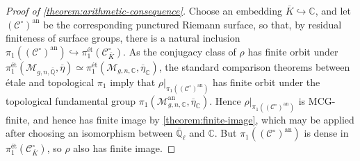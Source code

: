 \begin{proof}[Proof of \autoref{theorem:arithmetic-consequence}]
	Choose an embedding $\overline{K}\hookrightarrow\mathbb{C}$, and let
	$(\mathscr{C}^\circ)^{\text{an}}$ be the corresponding punctured Riemann
	surface, so that,
	by residual finiteness of surface groups,
	there is a natural inclusion
	$\pi_1((\mathscr{C}^\circ)^{\text{an}})\hookrightarrow
	\pi_1^{\text{\'et}}(\mathscr{C}^\circ_{\overline{K}})$. As the conjugacy
	class of $\rho$ has finite orbit under
	$\pi_1^{\text{\'et}}(\mathscr{M}_{g,n, \overline{\mathbb{Q}}},
	\overline{\eta})
	\simeq \pi_1^{\text{\'et}}(\mathscr{M}_{g,n, \mathbb{C}},
\overline{\eta}_{\mathbb C})$, the standard comparison theorems between \'etale and
	topological $\pi_1$
	\cite[Expos\'e XII, Corollaire 5.2]{sga1}
	imply that
	$\rho|_{\pi_1((\mathscr{C}^\circ)^{\text{an}})}$ has finite orbit under
	the topological fundamental group
	$\pi_1(\mathscr{M}_{g,n, \mathbb{C}}^{\text{an}},
	\overline{\eta}_{\mathbb{C}})$. Hence
	$\rho|_{\pi_1((\mathscr{C}^\circ)^{\text{an}})}$ is MCG-finite, and hence has
	finite image by \autoref{theorem:finite-image},
	which may be applied after choosing an isomorphism between $\overline{\mathbb{Q}}_\ell$ and $\mathbb{C}$.
	But
	$\pi_1( (\mathscr{C}^\circ)^{\text{an}})$ is dense in
	$\pi_1^{\text{\'et}}(\mathscr{C}^\circ_{\overline{K}})$, so $\rho$ also
	has finite image.
%

\end{proof}
